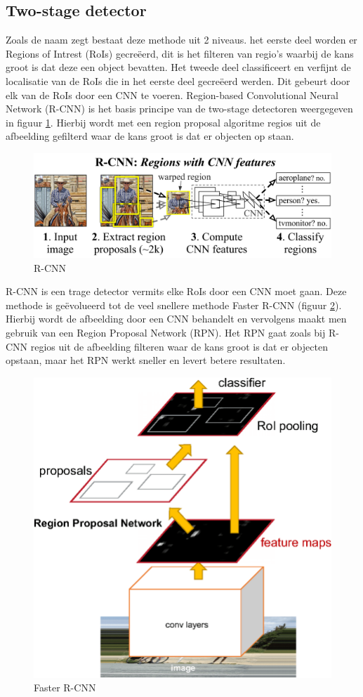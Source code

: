 \subsection{Two-stage detector}
Zoals de naam zegt bestaat deze methode uit 2 niveaus. het eerste deel worden er Regions of Intrest (RoIs) gecre\"eerd, dit is het filteren van regio's waarbij de kans groot is dat deze een object bevatten. Het tweede deel classificeert en verfijnt de localisatie van de RoIs die in het eerste deel gecre\"eerd werden. Dit gebeurt door elk van de RoIs door een CNN te voeren. Region-based Convolutional Neural Network (R-CNN) is het basis principe van de two-stage detectoren weergegeven in figuur \ref{fig:r-cnn}. Hierbij wordt met een region proposal algoritme regios uit de afbeelding gefilterd waar de kans groot is dat er objecten op staan.

\begin{figure}[!ht]
 	\centering
 	\includegraphics[width=0.70\linewidth]{fig/R-CNN.jpg}
 	\caption{R-CNN}
 	\label{fig:r-cnn}
\end{figure}
 
R-CNN is een trage detector vermits elke RoIs door een CNN moet gaan. Deze methode is ge\"evolueerd tot de veel snellere methode Faster R-CNN (figuur \ref{fig:faster-r-cnn}). Hierbij wordt de afbeelding door een CNN behandelt en vervolgens maakt men gebruik van een Region Proposal Network (RPN). Het RPN gaat zoals bij R-CNN regios uit de afbeelding filteren waar de kans groot is dat er objecten opstaan, maar het RPN werkt sneller en levert betere resultaten. 

\begin{figure}[!ht]
    \centering
 	\includegraphics[width=0.3\linewidth]{fig/Faster-R-CNN.png}
 	\caption{Faster R-CNN}
 	\label{fig:faster-r-cnn}
\end{figure}

